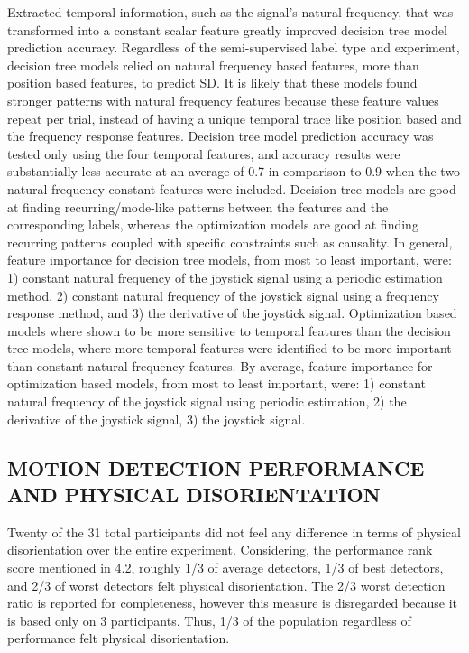 \documentclass[11pt, onecolumn]{article}
\begin{document}
Extracted temporal information, such as the signal's natural frequency, that was transformed into a constant scalar feature greatly improved decision tree model prediction accuracy.  Regardless of the semi-supervised label type and experiment, decision tree models relied on natural frequency based features, more than position based features, to predict SD.  It is likely that these models found stronger patterns with natural frequency features because these feature values repeat per trial, instead of having a unique temporal trace like position based and the frequency response features. Decision tree model prediction accuracy was tested only using the four temporal features, and accuracy results were substantially less accurate at an average of 0.7 in comparison to 0.9 when the two natural frequency constant features were included.  Decision tree models are good at finding recurring/mode-like patterns between the features and the corresponding labels, whereas the optimization models are good at finding recurring patterns coupled with specific constraints such as causality.  In general, feature importance for decision tree models, from most to least important, were: 1) constant natural frequency of the joystick signal using a periodic estimation method, 2) constant natural frequency of the joystick signal using a frequency response method, and 3) the derivative of the joystick signal.  Optimization based models where shown to be more sensitive to temporal features than the decision tree models, where more temporal features were identified to be more important than constant natural frequency features.  By average, feature importance for optimization based models, from most to least important, were: 1) constant natural frequency of the joystick signal using periodic estimation, 2) the derivative of the joystick signal, 3) the joystick signal.

\subsection{MOTION DETECTION PERFORMANCE AND PHYSICAL DISORIENTATION}
Twenty of the 31 total participants did not feel any difference in terms of physical disorientation over the entire experiment.  Considering, the performance rank score mentioned in 4.2, roughly 1/3 of average detectors, 1/3 of best detectors, and 2/3 of worst detectors felt physical disorientation.  The 2/3 worst detection ratio is reported for completeness, however this measure is disregarded because it is based only on 3 participants.  Thus, 1/3 of the population regardless of performance felt physical disorientation.
\end{document}
